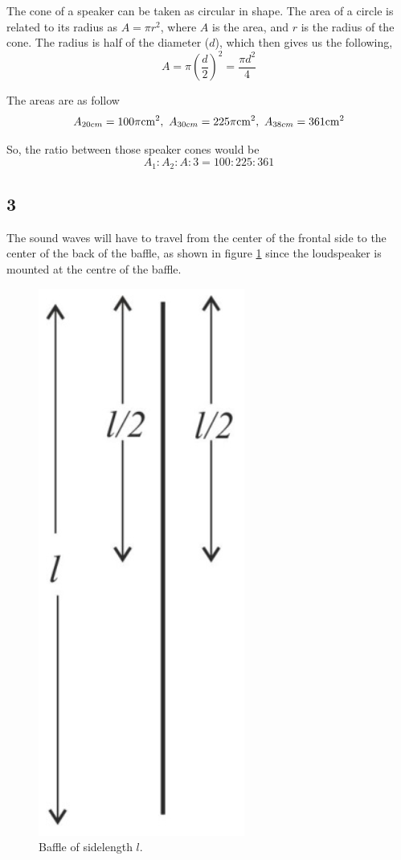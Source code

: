 \documentclass{article}
\begin{document}
The cone of a speaker can be taken as circular in shape. The area of a circle is related to its radius as $A=\pi r^2$, where $A$ is the area, and $r$ is the radius of the cone. The radius is half of the diameter ($d$), which then gives us the following,
\begin{equation}
    A=\pi (\frac{d}{2})^2 = \frac{\pi d^2}{4}
    \label{eq:areal}
\end{equation}

The areas are as follow
\begin{equation}
    A_{20 cm} = 100 \pi {\rm cm}^2, \ A_{30 cm} = 225 \pi {\rm cm}^2, \ A_{38 cm} = 361 {\rm cm}^2
\end{equation}

So, the ratio between those speaker cones would be 
\begin{equation}
    A_1 : A_2 : A:3 = 100:225:361
\end{equation}



\subsection*{3}

The sound waves will have to travel from the center of the frontal side to the center of the back of the baffle, as shown in figure \ref{fig:baffel} since the loudspeaker is mounted at the centre of the baffle.

\begin{figure}[H]
    \centering
    \includegraphics{figures/oving3_1_solutions.png}
    \caption{Baffle of sidelength $l$.}
    \label{fig:baffel}
\end{figure}
\end{document}
